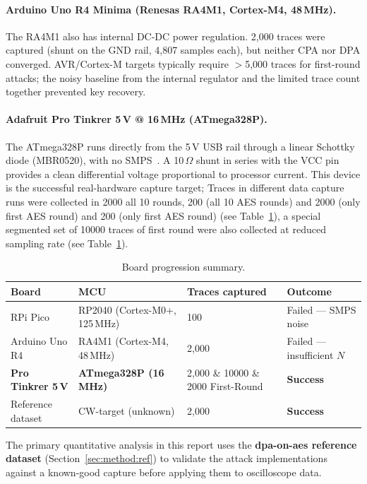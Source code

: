 \paragraph{Arduino Uno R4 Minima (Renesas RA4M1, Cortex-M4, 48\,MHz).}
The RA4M1 also has internal DC-DC power regulation.
2{,}000 traces were captured (shunt on the GND rail, 4{,}807 samples each),
but neither CPA nor DPA converged.
AVR/Cortex-M targets typically require $>$5{,}000 traces for first-round
attacks; the noisy baseline from the internal regulator and the limited
trace count together prevented key recovery.

\paragraph{Adafruit Pro Tinkrer 5\,V @ 16\,MHz (ATmega328P).}
The ATmega328P runs directly from the 5\,V USB rail through a
linear Schottky diode (MBR0520), with no
SMPS~\cite{adafruit_trinket_pro,atmega328p}.
A 10\,$\Omega$ shunt in series with the VCC pin provides a clean differential
voltage proportional to processor current.
This device is the successful real-hardware capture target;
Traces in different data capture runs were collected in 2000 all 10 rounds, 200 (all 10 AES rounds) and 2000 (only first AES round) and 200 (only first AES round) (see Table~\ref{tab:boards}), a special segmented set of 10000 traces of first round were also collected at reduced sampling rate (see Table~\ref{tab:boards}).

\begin{table}[H]
\centering
\caption{Board progression summary.}
\label{tab:boards}
\begin{tabular}{@{}llll@{}}
\toprule
Board & MCU & Traces captured & Outcome \\
\midrule
RPi Pico & RP2040 (Cortex-M0+, 125\,MHz) & 100 & Failed — SMPS noise \\
Arduino Uno R4 & RA4M1 (Cortex-M4, 48\,MHz) & 2{,}000 & Failed — insufficient $N$ \\
\textbf{Pro Tinkrer 5\,V} & \textbf{ATmega328P (16\,MHz)} & 2{,}000 \& 10000 \& 2000 First-Round & \textbf{Success} \\
Reference dataset & CW-target (unknown) & 2{,}000 & \textbf{Success} \\
\bottomrule
\end{tabular}
\end{table}

The primary quantitative analysis in this report uses the
\textbf{dpa-on-aes reference dataset}
(Section~\ref{sec:method:ref}) to validate the attack implementations
against a known-good capture before applying them to oscilloscope data.

